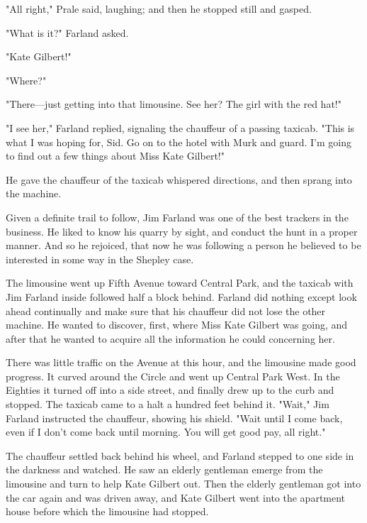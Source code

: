 \documentclass{novel}
\begin{document}
"All right," Prale said, laughing; and then he stopped still and gasped.

"What is it?" Farland asked.

"Kate Gilbert!"

"Where?"

"There---just getting into that limousine. See her? The girl with the red hat!"

"I see her," Farland replied, signaling the chauffeur of a passing taxicab. "This is what I was hoping for, Sid. Go on to the hotel with Murk and guard. I'm going to find out a few things about Miss Kate Gilbert!"

He gave the chauffeur of the taxicab whispered directions, and then sprang into the machine.

\vspace{2\nbs}
\clearpage
\thispagestyle{empty}

\begin{ChapterStart}
\vspace{3\nbs}
\end{ChapterStart}
    
Given a definite trail to follow, Jim Farland was one of the best trackers in the business. He liked to know his quarry by sight, and conduct the hunt in a proper manner. And so he rejoiced, that now he was following a person he believed to be interested in some way in the Shepley case.

The limousine went up Fifth Avenue toward Central Park, and the taxicab with Jim Farland inside followed half a block behind. Farland did nothing except look ahead continually and make sure that his chauffeur did not lose the other machine. He wanted to discover, first, where Miss Kate Gilbert was going, and after that he wanted to acquire all the information he could concerning her.

There was little traffic on the Avenue at this hour, and the limousine made good progress. It curved around the Circle and went up Central Park West. In the Eighties it turned off into a side street, and finally drew up to the curb and stopped. The taxicab came to a halt a hundred feet behind it. "Wait," Jim Farland instructed the chauffeur, showing his shield. "Wait until I come back, even if I don't come back until morning. You will get good pay, all right."

The chauffeur settled back behind his wheel, and Farland stepped to one side in the darkness and watched. He saw an elderly gentleman emerge from the limousine and turn to help Kate Gilbert out. Then the elderly gentleman got into the car again and was driven away, and Kate Gilbert went into the apartment house before which the limousine had stopped.
\end{document}

